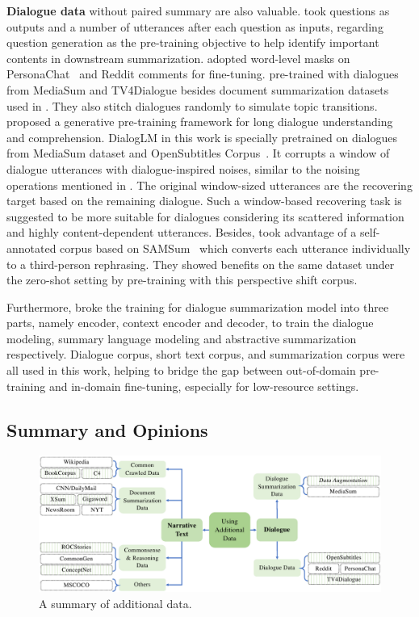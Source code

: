 \textbf{Dialogue data} without paired summary are also valuable.
\citet{feng2020dialogue} took questions as outputs and a number of utterances after each question as inputs, regarding question generation as the pre-training objective to help identify important contents in downstream summarization. 
\citet{khalifa2021bag} adopted word-level masks on PersonaChat~\cite{zhang2018personalizing} and Reddit comments 
for fine-tuning. 
\citet{qi2021improving} pre-trained with dialogues from MediaSum and TV4Dialogue besides document summarization datasets used in \citet{zhu2020end}. They also stitch dialogues randomly to simulate topic transitions. 
\citet{zhong2021dialoglm} proposed a generative pre-training framework for long dialogue understanding and comprehension. DialogLM in this work is specially pretrained on dialogues from MediaSum dataset and OpenSubtitles Corpus~\cite{lison2016opensubtitles2016}. It corrupts a window of dialogue utterances with dialogue-inspired noises, similar to the noising operations mentioned in . 
The original window-sized utterances are the recovering target based on the remaining dialogue. Such a window-based recovering task is suggested to be more suitable for dialogues considering its scattered information and highly content-dependent utterances. 
Besides, \citet{amanda-etal-2022-shift} took advantage of a self-annotated corpus based on SAMSum~\cite{gliwa2019samsum} which converts each utterance individually to a third-person rephrasing.
They showed benefits on the same dataset under the zero-shot setting by pre-training with this perspective shift corpus.


Furthermore, \citet{zou2021low} broke the training for dialogue summarization 
model into three parts, namely encoder, context encoder and decoder, 
to train the dialogue modeling, summary language modeling and 
abstractive summarization respectively. 
Dialogue corpus, short text corpus, and summarization corpus were all 
used in this work, helping to bridge the gap between out-of-domain 
pre-training and in-domain fine-tuning, especially for low-resource settings.
	
\subsection{Summary and Opinions}

\begin{figure}
	\centering
	\includegraphics[scale=0.65]{fig/approach-data.pdf}
	\caption{A summary of additional data.}
	\label{fig:app-data}
\end{figure}

